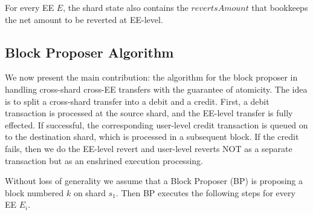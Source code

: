 \documentclass{article}
\begin{document}
For every EE $E$, the shard state also contains the $revertsAmount$ that bookkeeps the net amount to be reverted at EE-level.

\subsection{Block Proposer Algorithm}
We now present the main contribution: the algorithm for the block proposer in handling cross-shard cross-EE transfers with the guarantee of atomicity. The idea is to split a cross-shard transfer into a debit and a credit. First, a debit transaction is processed at the source shard, and the EE-level transfer is fully effected. If successful, the corresponding user-level credit transaction is queued on to the destination shard, which is processed in a subsequent block. If the credit fails, then we do the EE-level revert and user-level reverts NOT as a separate transaction but as an enshrined execution processing. 

Without loss of generality we assume that a Block Proposer (BP) is proposing a block numbered $k$ on shard $s_1$. Then BP executes the following steps for every EE $E_i$. 
\end{document}
